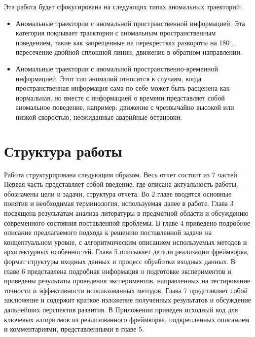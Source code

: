 Эта работа будет сфокусирована на следующих типах аномальных траекторий:

\begin{itemize}
	\item Аномальные траектории с аномальной пространственной информацией. Эта категория покрывает траектории с аномальным пространственным поведением, такие как запрещенные на перекрестках развороты на 180$^{\circ}$, пересечение двойной сплошной линии, движение в обратном направлении.
	\item Аномальные траектории с аномальной пространственно-временной информацией. Этот тип аномалий относится к случаям, когда пространственная информация сама по себе может быть расценена как нормальная, но вместе с информацией о времени представляет собой аномальное поведение, например: движение с чрезвычайно высокой или низкой скоростью, неожиданные аварийные остановки.
\end{itemize}

\section{Структура работы}

Работа структурирована следующим образом. Весь отчет состоит из 7 частей. Первая часть представляет собой введение, где описана актуальность работы, обозначены цели и задачи, структура отчета. Во 2 главе вводятся основные понятия и необходимая терминология, используемая далее в работе. Глава 3 посвящена результатам анализа литературы в предметной области и обсуждению современного состояния поставленной проблемы. В главе 4 приведено подробное описание предлагаемого подхода к решению поставленной задачи на концептуальном уровне, с алгоритмическим описанием используемых методов и архитектурных особенностей. Глава 5 описывает детали реализации фреймворка, формат структуры входных данных и процесс обработки входных данных. В главе 6 представлена подробная информация о подготовке экспериментов и приведены результаты проведения экспериментов, направленных на тестирование точности и эффективности использованных методов. Глава 7 представляет собой заключение и содержит краткое изложение полученных результатов и обсуждение дальнейших перспектив развития. В Приложении приведен исходный код для ключевых алгоритмов из реализованного фреймворка, подкрепленных описанием и комментариями, представленными в главе 5.
